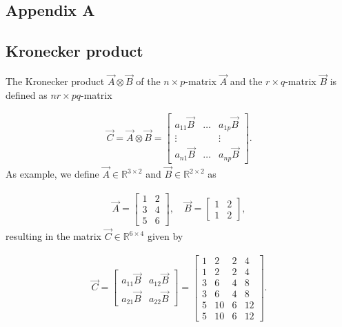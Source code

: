 \begin{appendices}
	
\chapter{Appendix A} \label{apx:AppendixA}
\section{Kronecker product}

The Kronecker product $\vec{A} \otimes \vec{B}$ of the $n \times p$-matrix $\vec{A}$ and the $r \times q$-matrix $\vec{B}$ is defined as $nr \times pq$-matrix 

\begin{align}
	\vec{C} = \vec{A} \otimes \vec{B} = 
		\begin{bmatrix}
			a_{11} \vec{B} & \dots & a_{1p} \vec{B} \\
			\vdots 	       &       &  \vdots \\
			a_{n1} \vec{B} & \dots & a_{np} \vec{B}     
		\end{bmatrix}. 
\end{align}
%
As example, we define $\vec{A} \in \mathbb{R}^{3 \times 2}$ and $\vec{B} \in \mathbb{R}^{2 \times 2}$ as

\begin{align}
	\vec{A} = \begin{bmatrix}
			1 & 2  \\
			3 & 4 \\
			5 & 6		
		\end{bmatrix}, \quad 
	\vec{B} = 
		\begin{bmatrix}
			1 & 2  \\
			1 & 2   
		\end{bmatrix},
\end{align}
%
resulting in the matrix $\vec{C} \in \mathbb{R}^{6 \times 4}$ given by

\begin{align}
	\vec{C} = 
	\begin{bmatrix}
		a_{11} \vec{B} &  a_{12} \vec{B} \\
		a_{21} \vec{B} &  a_{22} \vec{B}
	\end{bmatrix} = 
	\begin{bmatrix}
		1 & 2 & 2 & 4  \\
		1 & 2 & 2 & 4 \\
		3 & 6 & 4 & 8 \\
		3 & 6 & 4 & 8 \\
		5 & 10& 6 &12 \\
		5 & 10& 6 &12
	\end{bmatrix}.
\end{align}


\end{appendices}
